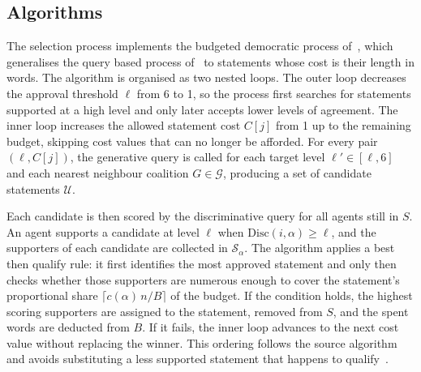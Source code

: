 \documentclass[letterpaper,11pt]{article}
\newcommand{\makedemproc}{\SetAlgorithmName{Process}{demproc}{List of Democratic Processes}}
\theoremstyle{plain}
\theoremstyle{definition}
\begin{document}
\subsection{Algorithms}

The selection process implements the budgeted democratic process of~\citet{boehmer2025nextgen}, which generalises the query based process of~\citet{fish2026gsc} to statements whose cost is their length in words. The algorithm is organised as two nested loops. The outer loop decreases the approval threshold $\ell$ from 6 to 1, so the process first searches for statements supported at a high level and only later accepts lower levels of agreement. The inner loop increases the allowed statement cost $C[j]$ from 1 up to the remaining budget, skipping cost values that can no longer be afforded. For every pair $(\ell, C[j])$, the generative query is called for each target level $\ell' \in [\ell,6]$ and each nearest neighbour coalition $G \in \mathcal{G}$, producing a set of candidate statements $\mathcal{U}$.

Each candidate is then scored by the discriminative query for all agents still in $S$. An agent supports a candidate at level $\ell$ when $\mathrm{Disc}(i,\alpha) \ge \ell$, and the supporters of each candidate are collected in $\mathcal{S}_{\alpha}$. The algorithm applies a best then qualify rule: it first identifies the most approved statement and only then checks whether those supporters are numerous enough to cover the statement's proportional share $\lceil c(\alpha)\,n/B\rceil$ of the budget. If the condition holds, the highest scoring supporters are assigned to the statement, removed from $S$, and the spent words are deducted from $B$. If it fails, the inner loop advances to the next cost value without replacing the winner. This ordering follows the source algorithm and avoids substituting a less supported statement that happens to qualify~\citep{boehmer2025nextgen}.

\end{document}
